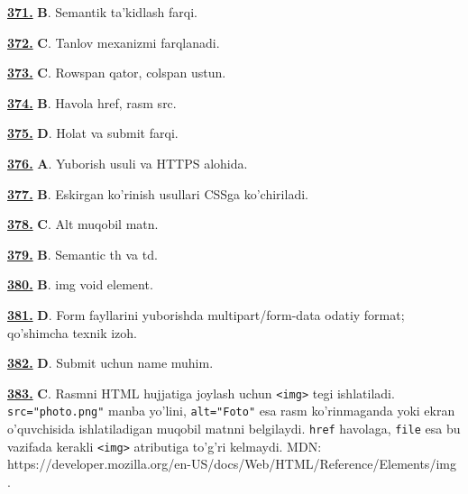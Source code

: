 \documentclass[10pt,a4paper,oneside]{article}
\begin{document}
\noindent\hyperlink{q371}{\textbf{371.}} \textbf{B}.  Semantik ta'kidlash farqi.
\par\vspace{3mm}
\noindent\hyperlink{q372}{\textbf{372.}} \textbf{C}.  Tanlov mexanizmi farqlanadi.
\par\vspace{3mm}
\noindent\hyperlink{q373}{\textbf{373.}} \textbf{C}.  Rowspan qator, colspan ustun.
\par\vspace{3mm}
\noindent\hyperlink{q374}{\textbf{374.}} \textbf{B}.  Havola href, rasm src.
\par\vspace{3mm}
\noindent\hyperlink{q375}{\textbf{375.}} \textbf{D}.  Holat va submit farqi.
\par\vspace{3mm}
\noindent\hyperlink{q376}{\textbf{376.}} \textbf{A}.  Yuborish usuli va HTTPS alohida.
\par\vspace{3mm}
\noindent\hyperlink{q377}{\textbf{377.}} \textbf{B}.  Eskirgan ko'rinish usullari CSSga ko'chiriladi.
\par\vspace{3mm}
\noindent\hyperlink{q378}{\textbf{378.}} \textbf{C}.  Alt muqobil matn.
\par\vspace{3mm}
\noindent\hyperlink{q379}{\textbf{379.}} \textbf{B}.  Semantic th va td.
\par\vspace{3mm}
\noindent\hyperlink{q380}{\textbf{380.}} \textbf{B}.  img void element.
\par\vspace{3mm}
\noindent\hyperlink{q381}{\textbf{381.}} \textbf{D}.  Form fayllarini yuborishda multipart/form-data odatiy format; qo'shimcha texnik izoh.
\par\vspace{3mm}
\noindent\hyperlink{q382}{\textbf{382.}} \textbf{D}.  Submit uchun name muhim.
\par\vspace{3mm}
\noindent\hyperlink{q383}{\textbf{383.}} \textbf{C}.  Rasmni HTML hujjatiga joylash uchun \texttt{\textless{}img\textgreater{}} tegi ishlatiladi. \texttt{src="photo.png"} manba yo'lini, \texttt{alt="Foto"} esa rasm ko'rinmaganda yoki ekran o'quvchisida ishlatiladigan muqobil matnni belgilaydi. \texttt{href} havolaga, \texttt{file} esa bu vazifada kerakli \texttt{\textless{}img\textgreater{}} atributiga to'g'ri kelmaydi. MDN: https://developer.mozilla.org/en-US/docs/Web/HTML/Reference/Elements/img .
\end{document}

